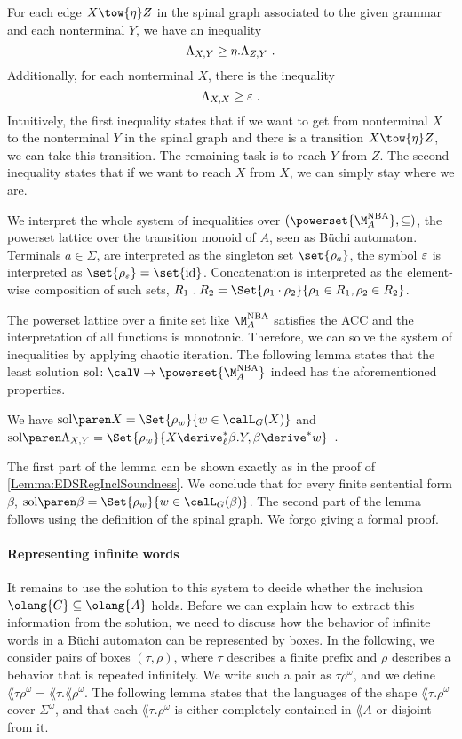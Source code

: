 \documentclass[../../diss.tex]{subfiles}
\begin{document}
For each edge $X \tow{\eta} Z$ in the spinal graph associated to the given grammar and each nonterminal $Y$, we have an inequality
\[
    \Lambda_{X,Y} \geq \eta . \Lambda_{Z,Y}
    \ .
\]
Additionally, for each nonterminal $X$, there is the inequality
\[
    \Lambda_{X,X} \geq \varepsilon
    \ .
\]
Intuitively, the first inequality states that if we want to get from nonterminal $X$ to the nonterminal $Y$ in the spinal graph and there is a transition $X \tow{\eta} Z$, we can take this transition.
The remaining task is to reach $Y$ from $Z$.
The second inequality states that if we want to reach $X$ from $X$, we can simply stay where we are.


We interpret the whole system of inequalities over $(\powerset{\nbatransmonoid{A}},\subseteq)$, the powerset lattice over the transition monoid of $A$, seen as Büchi automaton.
Terminals $a \in \Sigma$, are interpreted as the singleton set $\set{\tbox{a}}$, the symbol $\varepsilon$ is interpreted as $\set{\tbox{\eps}} = \set{\id}$.
Concatenation is interpreted as the element-wise composition of such sets, $R_1 \comp R_2 = \Set{ \rho_1 \relcomp \rho_2 }{ \rho_1 \in R_1, \rho_2 \in R_2}$.

The powerset lattice over a finite set like $\nbatransmonoid{A}$ satisfies the ACC and the interpretation of all functions is monotonic.
Therefore, we can solve the system of inequalities by applying chaotic iteration.
The following lemma states that the least solution $\sol \colon \vars \to \powerset{\nbatransmonoid{A}}$ indeed has the aforementioned properties.

\begin{lemma}%
\label{Lemma:EDSOmegaRegInclSoundnessHelper}%
    We have $\sol{X} = \Set{ \tbox{w} }{ w \in \calL_G(X)}$ and
    $\sol{\cvar{X}{Y}} = \Set{ \tbox{w} }{ X \leftderive^* \beta.Y, \beta \derive^* w }$\ .
\end{lemma}

The first part of the lemma can be shown exactly as in the proof of \cref{Lemma:EDSRegInclSoundness}.
We conclude that for every finite sentential form $\beta$, $\sol{\beta} = \Set{\tbox{w}}{ w \in \calL_G(\beta)}$.
The second part of the lemma follows using the definition of the spinal graph.
We forgo giving a formal proof.

\paragraph{Representing infinite words}

It remains to use the solution to this system to decide whether the inclusion $\olang{G} \subseteq \olang{A}$ holds.
Before we can explain how to extract this information from the solution, we need to discuss how the behavior of infinite words in a Büchi automaton can be represented by boxes.
In the following, we consider pairs of boxes $(\tau,\rho)$, where $\tau$ describes a finite prefix and $\rho$ describes a behavior that is repeated infinitely.
We write such a pair as $\tau\rho^\omega$, and we define $\lang{\tau\rho^\omega} = \lang{\tau}.\lang{\rho}^\omega$.
The following lemma states that the languages of the shape $\lang{\tau.\rho^\omega}$ cover $\Sigma^\omega$, and that each  $\lang{\tau.\rho^\omega}$ is either completely contained in $\lang{A}$ or disjoint from it.
\end{document}
